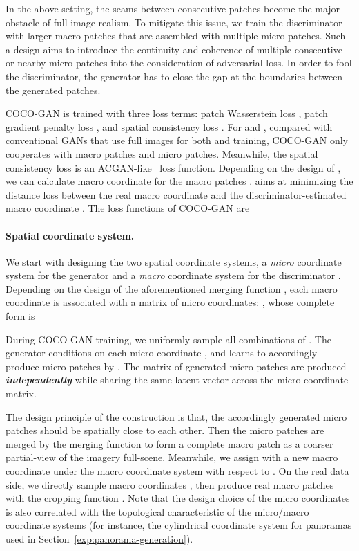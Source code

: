 \documentclass{article}
\newcommand{\modelName}{COCO-GAN }
\begin{document}
    In the above setting, the seams between consecutive patches become the major obstacle of full image realism. To mitigate this issue, we train the discriminator with larger macro patches that are assembled with multiple micro patches. Such a design aims to introduce the continuity and coherence of multiple consecutive or nearby micro patches into the consideration of adversarial loss. In order to fool the discriminator, the generator has to close the gap at the boundaries between the generated patches.  
    


    \modelName is trained with three loss terms: patch Wasserstein loss , patch gradient penalty loss , and spatial consistency loss . For  and , compared with conventional GANs that use full images  for both  and  training, \modelName only cooperates with macro patches and micro patches. Meanwhile, the spatial consistency loss  is an ACGAN-like~\cite{ACGAN} loss function. Depending on the design of , we can calculate macro coordinate  for the macro patches .  aims at minimizing the distance loss between the real macro coordinate  and the discriminator-estimated macro coordinate . The loss functions of \modelName are
    



    \paragraph{Spatial coordinate system.} 
We start with designing the two spatial coordinate systems, a \emph{micro} coordinate system for the generator  and a \emph{macro} coordinate system for the discriminator . Depending on the design of the aforementioned merging function , each macro coordinate  is associated with a matrix of micro coordinates: , whose complete form is
    
    During \modelName training, we uniformly sample all combinations of . The generator  conditions on each micro coordinate , and learns to accordingly produce micro patches  by . The matrix of generated micro patches
     are produced \emph{\textbf{independently}} while sharing the same latent vector  across the micro coordinate matrix.
    
    The design principle of the  construction is that, the accordingly generated micro patches  should be spatially close to each other. Then the micro patches are merged by the merging function  to form a complete macro patch  as a coarser partial-view of the imagery full-scene. Meanwhile, we assign  with a new macro coordinate  under the macro coordinate system with respect to . On the real data side, we directly sample macro coordinates , then produce real macro patches  with the cropping function . Note that the design choice of the micro coordinates  is also correlated with the topological characteristic of the micro/macro coordinate systems (for instance, the cylindrical coordinate system for panoramas used in Section~\ref{exp:panorama-generation}).
    
\end{document}
